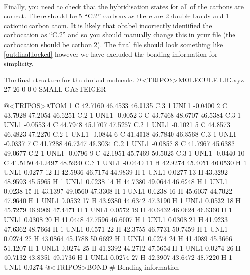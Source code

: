     \paragraph{}
        Finally, you need to check that the hybridisation states for all of the carbons are correct. There should be 5 \enquote{C.2} carbons as there are 2 double bonds and 1 cationic carbon atom. It is likely that obabel incorrectly identified the carbocation as \enquote{C.2} and so you should manually change this in your file (the carbocation should be carbon 2). The final file should look something like \cref{out:finaldocked} however we have excluded the bonding information for simplicity.

    \begin{bashoutput}[label=out:finaldocked]{The final structure for the docked molecule.}
@<TRIPOS>MOLECULE
LIG.xyz
 27 26 0 0 0
SMALL
GASTEIGER

@<TRIPOS>ATOM
    1 C  42.7160   46.4533   46.0135 C.3    1  UNL1    -0.0400
    2 C  43.7928   47.2054   46.6251 C.2    1  UNL1    -0.0052
    3 C  43.7468   48.6707   46.5384 C.3    1  UNL1    -0.0553
    4 C  44.7948   45.1707   47.5267 C.2    1  UNL1    -0.1021
    5 C  44.8573   46.4823   47.2270 C.2    1  UNL1    -0.0844
    6 C  41.4018   46.7840   46.8568 C.3    1  UNL1    -0.0337
    7 C  41.7288   46.7347   48.3034 C.2    1  UNL1    -0.0853
    8 C  41.7967   45.6383   49.0677 C.2    1  UNL1    -0.0796
    9 C  42.1951   45.7469   50.5025 C.3    1  UNL1    -0.0440
   10 C  41.5150   44.2497   48.5990 C.3    1  UNL1    -0.0440
   11 H  42.9274   45.4051   46.0530 H      1  UNL1     0.0277
   12 H  42.5936   46.7174   44.9839 H      1  UNL1     0.0277
   13 H  43.3292   48.9593   45.5965 H      1  UNL1     0.0238
   14 H  44.7380   49.0644   46.6248 H      1  UNL1     0.0238
   15 H  43.1397   49.0560   47.3308 H      1  UNL1     0.0238
   16 H  45.6037   44.7022   47.9640 H      1  UNL1     0.0532
   17 H  43.9380   44.6342   47.3190 H      1  UNL1     0.0532
   18 H  45.7279   46.9909   47.4471 H      1  UNL1     0.0572
   19 H  40.6432   46.0624   46.6360 H      1  UNL1     0.0308
   20 H  41.0448   47.7596   46.6007 H      1  UNL1     0.0308
   21 H  41.9233   47.6362   48.7664 H      1  UNL1     0.0571
   22 H  42.3755   46.7731   50.7459 H      1  UNL1     0.0274
   23 H  43.0864   45.1788   50.6692 H      1  UNL1     0.0274
   24 H  41.4089   45.3666   51.1207 H      1  UNL1     0.0274
   25 H  41.2392   44.2712   47.5654 H      1  UNL1     0.0274
   26 H  40.7132   43.8351   49.1736 H      1  UNL1     0.0274
   27 H  42.3907   43.6472   48.7220 H      1  UNL1     0.0274
@<TRIPOS>BOND
 # Bonding information
    \end{bashoutput}